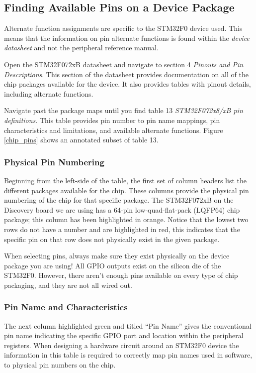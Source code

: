 \documentclass[11pt,fleqn]{book} %
\begin{document}
    \subsection{Finding Available Pins on a Device Package}
    
    Alternate function assignments are specific to the STM32F0 device used. This means that the information on pin alternate functions is found within the \textit{device datasheet} and not the peripheral reference manual.
    
    Open the STM32F072xB datasheet and navigate to section 4 \textit{Pinouts and Pin Descriptions}. This section of the datasheet provides documentation on all of the chip packages available for the device. It also provides tables with pinout details, including alternate functions.
    
    Navigate past the package maps until you find table 13 \textit{STM32F072x8/xB pin definitions}. This table provides pin number to pin name mappings, pin characteristics and limitations, and available alternate functions. Figure \ref{chip_pins} shows an annotated subset of table 13. 
    
    \subsubsection{Physical Pin Numbering}
    Beginning from the left-side of the table, the first set of column headers list the different packages available for the chip. These columns provide the physical pin numbering of the chip for that specific package. The STM32F072xB on the Discovery board we are using has a 64-pin low-quad-flat-pack (LQFP64) chip package; this column has been highlighted in orange. Notice that the lowest two rows do not have a number and are highlighted in red, this indicates that the specific pin on that row does not physically exist in the given package. 
    
    \begin{warning}
        When selecting pins, always make sure they exist physically on the device package you are using! All GPIO outputs exist on the silicon die of the STM32F0. However, there aren't enough pins available on every type of chip packaging, and they are not all wired out.
    \end{warning}

    \subsubsection{Pin Name and Characteristics}
    The next column highlighted green and titled ``Pin Name'' gives the conventional pin name indicating the specific GPIO port and location within the peripheral registers. When designing a hardware circuit around an STM32F0 device the information in this table is required to correctly map pin names used in software, to physical pin numbers on the chip. 
   
\end{document}
